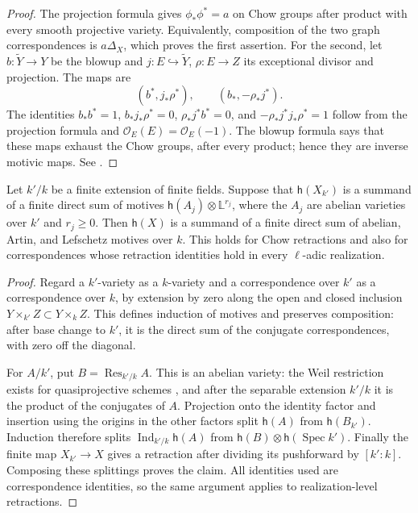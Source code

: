 \begin{proof}
The projection formula gives $\phi_*\phi^*=a$ on Chow groups after
product with every smooth projective variety. Equivalently, composition
of the two graph correspondences is $a\Delta_X$, which proves the
first assertion. For the second, let $b:\widetilde Y\to Y$ be the
blowup and $j:E\hookrightarrow\widetilde Y$, $\rho:E\to Z$ its
exceptional divisor and projection. The maps are
\[
 (b^*,j_*\rho^*),\qquad (b_*,-\rho_*j^*).
\]
The identities $b_*b^*=1$, $b_*j_*\rho^*=0$,
$\rho_*j^*b^*=0$, and
$-\rho_*j^*j_*\rho^*=1$ follow from the projection formula and
$\mathcal O_E(E)=\mathcal O_E(-1)$. The blowup formula says that
these maps exhaust the Chow groups, after every product; hence they
are inverse motivic maps. See \citet[Theorem 2.8(3), p.~1472,
and Corollary 3.10, p.~1484]{Jiang2023}.
\end{proof}

\begin{lemma}\label{lem:chow-descent}
Let $k'/k$ be a finite extension of finite fields. Suppose that
$\mathsf h(X_{k'})$ is a summand of a finite direct sum of motives
$\mathsf h(A_j)\otimes\mathbb L^{r_j}$, where the $A_j$ are abelian
varieties over $k'$ and $r_j\ge0$. Then $\mathsf h(X)$ is a summand
of a finite direct sum of abelian, Artin, and Lefschetz motives over
$k$. This holds for Chow retractions and also for correspondences
whose retraction identities hold in every $\ell$-adic realization.
\end{lemma}

\begin{proof}
Regard a $k'$-variety as a $k$-variety and a correspondence over $k'$
as a correspondence over $k$, by extension by zero along the open
and closed inclusion $Y\times_{k'}Z\subset Y\times_k Z$.
This defines induction of motives and preserves composition: after
base change to $k'$, it is the direct sum of the conjugate
correspondences, with zero off the diagonal.

For $A/k'$, put $B=\operatorname{Res}_{k'/k}A$. This is an abelian
variety: the Weil restriction exists for quasiprojective schemes
\citep[\S4.6, Proposition 4.6.3, pp.~110--111]{Poonen2017}, and after
the separable extension $k'/k$ it is the product of the conjugates
of $A$. Projection onto the identity factor and insertion using the
origins in the other factors split $\mathsf h(A)$ from
$\mathsf h(B_{k'})$. Induction therefore splits
$\operatorname{Ind}_{k'/k}\mathsf h(A)$ from
$\mathsf h(B)\otimes\mathsf h(\operatorname{Spec}k')$.
Finally the finite map $X_{k'}\to X$ gives a retraction after dividing
its pushforward by $[k':k]$. Composing these splittings proves the
claim. All identities used are correspondence identities, so the
same argument applies to realization-level retractions.
\end{proof}

